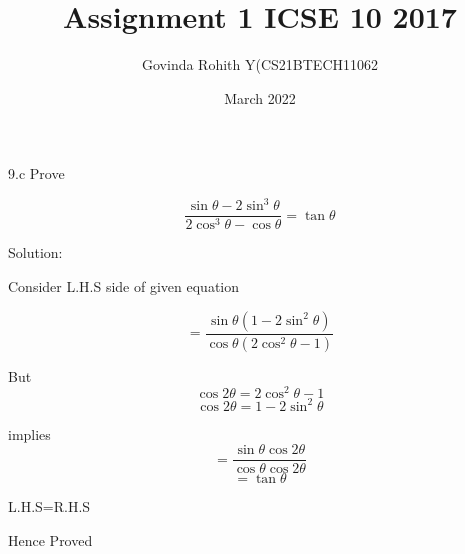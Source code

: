 \documentclass{article}
\title{Assignment 1 ICSE 10 2017}
\author{Govinda Rohith Y(CS21BTECH11062}
\date{March 2022}
\begin{document}
\maketitle

\begin{multicols}{2}


9.c Prove 

\begin{equation*}
\frac{\sin\theta-2\sin^3\theta}{2\cos^3\theta-\cos\theta}=\tan\theta
\end{equation*}
\large

Solution: 

\normalsize
\begin{flushleft}

Consider L.H.S side of given equation
\end{flushleft}


\begin{equation}
=\frac{\sin\theta(1-2\sin^2\theta)}{\cos\theta(2\cos^2\theta-1)}
\end{equation}

But
\begin{equation}
\cos2\theta=2\cos^2\theta-1 
\end{equation}
\begin{equation}
    \cos2\theta=1-2\sin^2\theta
\end{equation}

implies
\begin{equation}
    =\frac{\sin\theta \cos2\theta}{\cos\theta \cos2\theta}
\end{equation}
\begin{equation}
    =\tan\theta
\end{equation}
\begin{center}
    L.H.S=R.H.S
    
    Hence Proved
\end{center}

\end{multicols}
\end{document}
